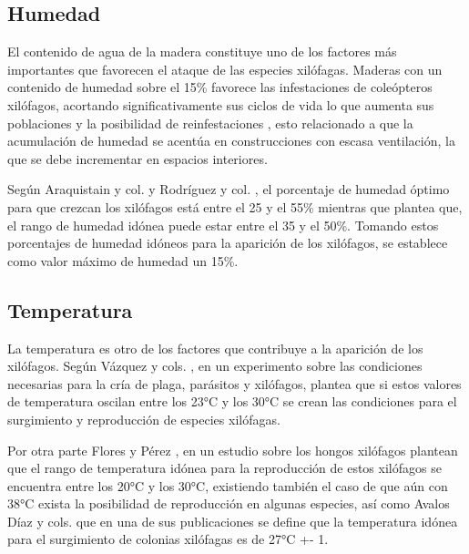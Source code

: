     \subsection{Humedad}

    El contenido de agua de la madera constituye uno de los factores más importantes que favorecen el ataque de las especies xilófagas. Maderas con un contenido de humedad sobre el 15\% favorece las infestaciones de coleópteros xilófagos, acortando significativamente sus ciclos de vida lo que aumenta sus poblaciones y la posibilidad de reinfestaciones \cite{ripa2004termitas}, esto relacionado a que la acumulación de humedad se acentúa en construcciones con escasa ventilación, la que se debe incrementar en espacios interiores.

    Según Araquistain y col. \cite{monitoringMoisture} y Rodríguez y col. \cite{rodriguezcodigo}, el porcentaje de humedad óptimo para que crezcan los xilófagos está entre el 25 y el 55\% mientras que \cite{woodPreservation} plantea que, el rango de humedad idónea puede estar entre el 35 y el 50\%. Tomando estos porcentajes de humedad idóneos para la aparición de los xilófagos, se establece como valor máximo de humedad un 15\%.

    \subsection{Temperatura}

    La temperatura es otro de los factores que contribuye a la aparición de los xilófagos. Según Vázquez y cols. \cite{vazquez1999avetianella}, en un experimento sobre las condiciones necesarias para la cría de plaga, parásitos y xilófagos, plantea que si estos valores de temperatura oscilan entre los 23°C y los 30°C se crean las condiciones para el surgimiento y reproducción de especies xilófagas. 

    Por otra parte Flores y Pérez \cite{floresDurabilidadNaturalDiez1987a}, en un estudio sobre los hongos xilófagos plantean que el rango de temperatura idónea para la reproducción de estos xilófagos se encuentra entre los 20°C y los 30°C, existiendo también el caso de que aún con 38°C exista la posibilidad de reproducción en algunas especies, así como Avalos Díaz y cols. \cite{avalosdiazInfluenciaDosHongos2020} que en una de sus publicaciones se define que la temperatura idónea para el surgimiento de colonias xilófagas es de 27°C +- 1.\\ 


